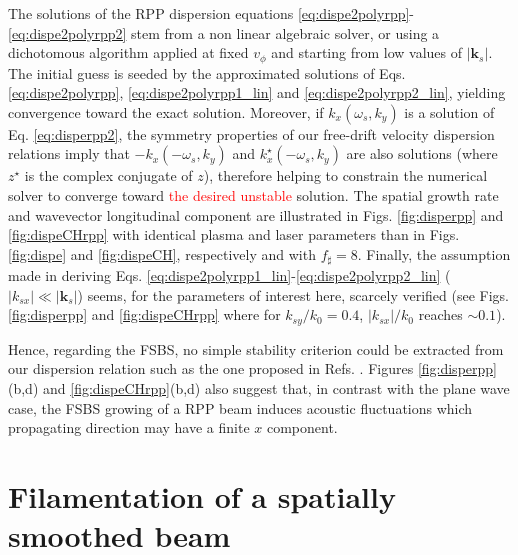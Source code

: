 \documentclass[
 reprint,
 superscriptaddress,
 amsmath,amssymb,
 aps,
]{revtex4-1}
\def\tc{\textcolor{red}}
\begin{document}
%
The solutions of the RPP dispersion  equations \eqref{eq:dispe2polyrpp}-\eqref{eq:dispe2polyrpp2} stem from a non linear algebraic solver, or using a dichotomous algorithm applied at fixed  $v_\phi$ and starting from low values of $\vert \mathbf{k}_s\vert$. The initial guess is  seeded by the approximated solutions of Eqs. \eqref{eq:dispe2polyrpp}, \eqref{eq:dispe2polyrpp1_lin} and  \eqref{eq:dispe2polyrpp2_lin}, yielding convergence toward the exact solution. Moreover, if $k_x(\omega_s, k_y)$ is a solution of Eq.  \eqref{eq:disperpp2},  the symmetry properties of our free-drift velocity  dispersion relations imply that  
$-k_x(-\omega_s, k_y)$ and $k_x^\star(-\omega_s, k_y)$ are also solutions (where $z^\star$ is the complex conjugate of $z$), therefore  helping to constrain the numerical solver to converge toward \tc{the desired unstable} solution. The spatial growth rate and wavevector longitudinal component are illustrated in  
Figs. \ref{fig:disperpp} and \ref{fig:dispeCHrpp} with identical plasma and laser parameters than in Figs.  \ref{fig:dispe} and \ref{fig:dispeCH}, respectively and with $f_\sharp=8$. Finally, the assumption made in deriving Eqs. \eqref{eq:dispe2polyrpp1_lin}-\eqref{eq:dispe2polyrpp2_lin} ($\vert k_{sx}\vert \ll \vert \mathbf{k}_s\vert$) seems, for the parameters of interest here, scarcely verified (see Figs. \ref{fig:disperpp} and  \ref{fig:dispeCHrpp} where for  $k_{sy}/k_0=0.4 $, $\vert k_{sx}\vert/k_0$ reaches $\sim 0.1$).

Hence, regarding the FSBS, no simple stability criterion could be extracted from our dispersion relation such as the one proposed in Refs. \cite[]{Lushnikov_2006,phd-Grech,PRL_Grech_2009}.
Figures \ref{fig:disperpp}(b,d) and \ref{fig:dispeCHrpp}(b,d) also suggest that, in contrast with the plane wave case, the FSBS growing of a RPP beam induces acoustic fluctuations which propagating direction may  have a finite $x$ component.

\section{Filamentation of a spatially smoothed beam}
\end{document}
